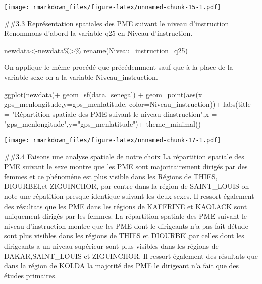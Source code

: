 \documentclass[
]{article}
\newenvironment{Shaded}{\begin{snugshade}}{\end{snugshade}}
\newcommand{\AttributeTok}[1]{\textcolor[rgb]{0.77,0.63,0.00}{#1}}
\newcommand{\FunctionTok}[1]{\textcolor[rgb]{0.00,0.00,0.00}{#1}}
\newcommand{\NormalTok}[1]{#1}
\newcommand{\OtherTok}[1]{\textcolor[rgb]{0.56,0.35,0.01}{#1}}
\newcommand{\SpecialCharTok}[1]{\textcolor[rgb]{0.00,0.00,0.00}{#1}}
\newcommand{\StringTok}[1]{\textcolor[rgb]{0.31,0.60,0.02}{#1}}
\begin{document}
\texttt{[image: rmarkdown\_files/figure-latex/unnamed-chunk-15-1.pdf]}

\#\#3.3 Représentation spatiales des PME suivant le niveau d'instruction
Renommons d'abord la variable q25 en Niveau d'instruction.

\begin{Shaded}
\begin{Highlighting}[]
\NormalTok{newdata}\OtherTok{\textless{}{-}}\NormalTok{newdata}\SpecialCharTok{\%\textgreater{}\%}
  \FunctionTok{rename}\NormalTok{(}\AttributeTok{Niveau\_instruction=}\NormalTok{q25)}
\end{Highlighting}
\end{Shaded}

On applique le même procédé que précédemment sauf que à la place de la
variable sexe on a la variable Niveau\_instruction.

\begin{Shaded}
\begin{Highlighting}[]
\FunctionTok{ggplot}\NormalTok{(newdata)}\SpecialCharTok{+}
  \FunctionTok{geom\_sf}\NormalTok{(}\AttributeTok{data=}\NormalTok{senegal) }\SpecialCharTok{+}
  \FunctionTok{geom\_point}\NormalTok{(}\FunctionTok{aes}\NormalTok{(}\AttributeTok{x =}\NormalTok{ gps\_menlongitude,}\AttributeTok{y=}\NormalTok{gps\_menlatitude, }\AttributeTok{color=}\NormalTok{Niveau\_instruction))}\SpecialCharTok{+}
  \FunctionTok{labs}\NormalTok{(}\AttributeTok{title =} \StringTok{"Répartition spatiale des PME suivant le niveau d\textquotesingle{}instruction"}\NormalTok{,}\AttributeTok{x =} \StringTok{"gps\_menlongitude"}\NormalTok{,}\AttributeTok{y=}\StringTok{"gps\_menlatitude"}\NormalTok{)}\SpecialCharTok{+}
  \FunctionTok{theme\_minimal}\NormalTok{()}
\end{Highlighting}
\end{Shaded}

\texttt{[image: rmarkdown\_files/figure-latex/unnamed-chunk-17-1.pdf]}

\#\#3.4 Faisons une analyse spatiale de notre choix La répartition
spatiale des PME suivant le sexe montre que les PME sont majoritairement
dirigés par des femmes et ce phénoméne est plus visible dans les Régions
de THIES, DIOURBEl,et ZIGUINCHOR, par contre dans la région de
SAINT\_LOUIS on note une répatition presque identique suivant les deux
sexes. Il ressort également des résultats que les PME dans les régions
de KAFFRINE et KAOLACK sont uniquement dirigés par les femmes. La
répartition spatiale des PME suivant le niveau d'instruction montre que
les PME dont le dirigeants n'a pas fait détude sont plus visibles dans
les régions de THIES et DIOURBEl,par celles dont les dirigeants a un
niveau supérieur sont plus visibles dans les régions de
DAKAR,SAINT\_LOUIS et ZIGUINCHOR. Il ressort également des résultats que
dans la région de KOLDA la majorité des PME le dirigeant n'a fait que
des études primaires.
\end{document}
